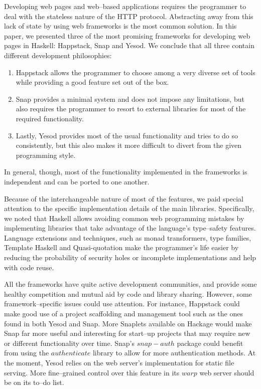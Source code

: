 Developing web pages and web--based applications requires the programmer to deal with the stateless nature of the HTTP protocol.
Abstracting away from this lack of state by using web frameworks is the most common solution. 
In this paper, we presented three of the most promising frameworks for developing web pages in Haskell: Happstack, Snap and Yesod.
We conclude that all three contain different development philosophies: 

\begin{enumerate}
	\item Happstack allows the programmer to choose among a very diverse set of tools while providing a good feature set out of the box.
	\item Snap provides a minimal system and does not impose any limitations, but also requires the programmer to resort to external libraries for most of the required functionality.
    \item Lastly, Yesod provides most of the usual functionality and tries to do so consistently, but this also makes it more difficult to divert from the given programming style.
\end{enumerate}

In general, though, most of the functionality implemented in the frameworks is independent and can be ported to one another.

Because of the interchangeable nature of most of the features, we paid special attention to the specific implementation details of the main libraries.
Specifically, we noted that Haskell allows avoiding common web programming mistakes by implementing libraries that take advantage of the language's type--safety features.
Language extensions and techniques, such as monad transformers, type families, Template Haskell and Quasi-quotation make the programmer's life easier by reducing the probability of security holes or incomplete implementations and help with code reuse.

All the frameworks have quite active development communities, and provide some healthy competition and mutual aid by code and library sharing.
However, some framework--specific issues could use attention.
For instance, Happstack could make good use of a project scaffolding and management tool such as the ones found in both Yesod and Snap.
More Snaplets available on Hackage would make Snap far more useful and interesting for start--up projects that may require new or different functionality over time.
Snap's $ snap-auth $ package could benefit from using the $ authenticate $ library to allow for more authentication methods.
At the moment, Yesod relies on the web server's implementation for static file serving. 
More fine--grained control over this feature in its $ warp $ web server should be on its to--do list.

